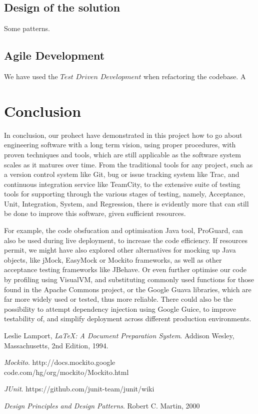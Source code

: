 \documentclass[11pt,twocolumn]{article} %
\begin{document}
\subsection{Design of the solution}
Some patterns.


\subsection{Agile Development}
We have used the $Test$ $Driven$ $Development$ when refactoring the codebase.
A

\subsection{}

\section{Conclusion}
In conclusion, our prohect have demonstrated in this project how to go about engineering software
with a long term vision, using proper procedures, with proven techniques and tools, which
are still applicable as the software system scales as it matures over time.
From the traditional tools for any project, such as a version control system like Git, bug
or issue tracking system like Trac, and continuous integration service like TeamCity, to
the extensive suite of testing tools for supporting through the various stages of testing,
namely, Acceptance, Unit, Integration, System, and Regression, there is evidently more
that can still be done to improve this software, given sufficient resources.

For example, the code obsfucation and optimisation Java tool, ProGuard, can also be used
during live deployment, to increase the code efficiency. If resources permit, we might have
also explored other alternatives for mocking up Java objects, like jMock, EasyMock or
Mockito frameworks, as well as other acceptance testing frameworks like JBehave.
Or even further optimise our code by profiling using VisualVM, and substituting commonly
used functions for those found in the Apache Commons project, or the Google Guava
libraries, which are far more widely used or tested, thus more reliable. There could also be
the possibility to attempt dependency injection using Google Guice, to improve testability
of, and simplify deployment across different production environments.


\begin{thebibliography}{9}

  Leslie Lamport,
  \emph{\LaTeX: A Document Preparation System}.
  Addison Wesley, Massachusetts,
  2nd Edition,
  1994.

  \emph{Mockito}.
  http://docs.mockito.google\\code.com/hg/org/mockito/Mockito.html  

  \emph{JUnit}.
  https://github.com/junit-team/junit/wiki

  \emph{Design Principles and Design Patterns}.
  Robert C. Martin,
  2000
  
\end{thebibliography}
\end{document}

